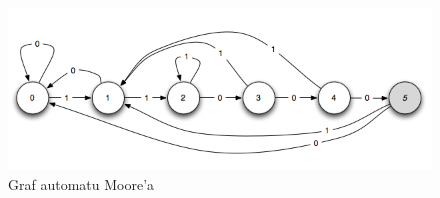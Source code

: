 \documentclass[wide,a4paper,titlepage,12pt] {article}
\begin{document}
    \begin{figure}[htbp]
    \begin{center}
      \includegraphics[scale=0.7]{moore-graf.png}
      \caption{Graf automatu Moore'a}
     \end{center}
  \end{figure}
\end{document}
